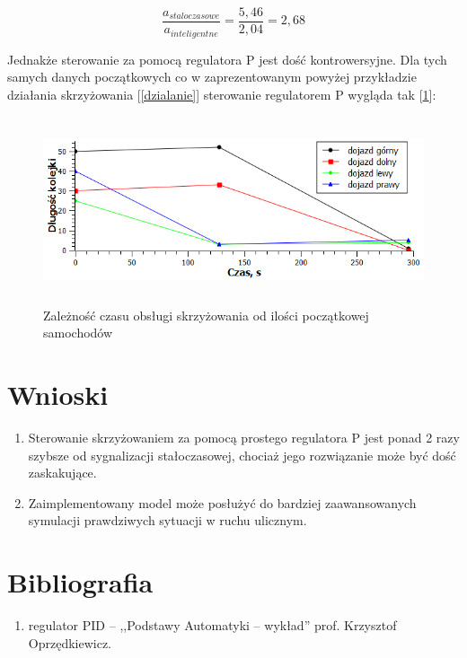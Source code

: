 \documentclass[11pt]{aghdpl}
\begin{document}
\begin{equation}
	\frac{a_{staloczasowe}}{a_{inteligentne}} = \frac{5,46}{2,04} = 2,68
\end{equation}

Jednakże sterowanie za pomocą regulatora P jest dość kontrowersyjne. Dla tych samych danych początkowych co w zaprezentowanym powyżej przykładzie działania skrzyżowania [\ref{dzialanie}] sterowanie regulatorem P wygląda tak [\ref{dzialanie2}]:
\begin{figure}[h!]
	\centering
	\includegraphics[height=55mm]{dzialanie2.png}
	\caption{Zależność czasu obsługi skrzyżowania od ilości początkowej samochodów}	
	\label{dzialanie2}
\end{figure}

\newpage

\section{Wnioski}
\begin{enumerate}
	\item Sterowanie skrzyżowaniem za pomocą prostego regulatora P jest ponad 2 razy szybsze od sygnalizacji stałoczasowej, chociaż jego rozwiązanie może być dość zaskakujące.
	\item Zaimplementowany model może posłużyć do bardziej  zaawansowanych symulacji prawdziwych sytuacji w ruchu ulicznym.
\end{enumerate}

\section{Bibliografia}
\begin{enumerate}
\item regulator PID -- ,,Podstawy Automatyki -- wykład'' prof. Krzysztof Oprzędkiewicz.

\end{enumerate}
\end{document}
